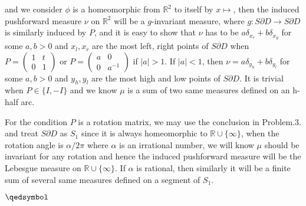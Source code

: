 \documentclass[lang=en,11pt,a4paper,citestyle =authoryear]{elegantpaper}
\newcommand{\prvd}{$\hfill \qedsymbol$}
\newcommand{\R}{\mathbb{R}}
\begin{document}
and we consider $\phi$ is a homeomorphic from $\R^2$ to itself by $x\mapsto $, then the induced pushforward measure $\nu$ on $\R^2$ will be a $g$-invariant measure, where $g: S\partial D \to S\partial D$ is similarly induced by $P$, and it is easy to show that $\nu$ has to be $a\delta_{x_r}+b\delta_{x_y}$ for some $a,b>0$ and $x_l,x_r$ are the most left, right points of $S\partial D$ when $P = \left(\begin{array}{c|c} 1 & t \\ 0 & 1\end{array}\right)$ or $P = \left(\begin{array}{c|c} a & 0 \\ 0 & a^{-1}\end{array}\right)$ if $|a|>1$. If $|a|<1$, then $\nu = a\delta_{y_h}+b\delta_{y_l}$ for some $a,b>0$ and $y_h,y_l$ are the most high and low points of $S\partial D$. It is trivial when $P \in \{I,-I\}$ and we know $\mu$ is a sum of two same measures defined on an h-half arc.\par
For the condition $P$ is a rotation matrix, we may use the conclusion in Problem.3. and treat $S\partial D$ as $S_1$ since it is always homeomorphic to $\R\cup{\{\infty\}}$, when the rotation angle is $\alpha/2\pi$ where $\alpha$ is an irrational number, we will know $\mu$ should be invariant for any rotation and hence the induced pushforward measure will be the Lebesgue measure on $\R\cup\{\infty\}$. If $\alpha$ is rational, then similarly it will be a finite sum of several same measures defined on a segment of $S_1$.\par
\prvd
\vspace{0.5em}

\addappheadtotoc
\end{document}
